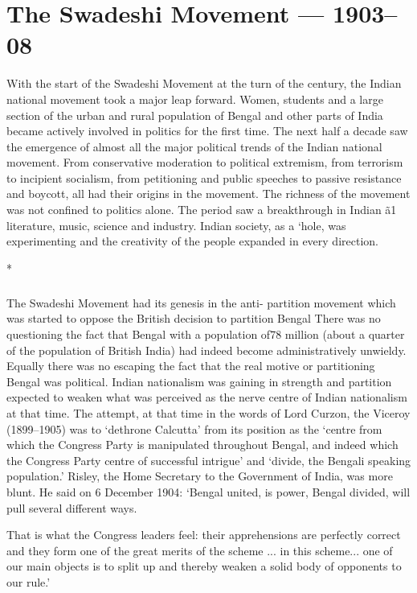 \chapter{The Swadeshi Movement --- 1903--08}\label{chapter:CH10}

With the start of the Swadeshi Movement at the turn of the century, the Indian national movement took a major leap forward. Women, students and a large section of the urban and rural population of Bengal and other parts of India became actively involved in politics for the first time. The next half a decade saw the emergence of almost all the major political trends of the Indian national movement. From conservative moderation to political extremism, from terrorism to incipient socialism, from petitioning and public speeches to passive resistance and boycott, all had their origins in the movement. The richness of the movement was not confined to politics alone. The period saw a breakthrough in Indian ã1 literature, music, science and industry. Indian society, as a `hole, was experimenting and the creativity of the people expanded in every direction.

\begin{center}*\end{center}

\paragraph*{}
The Swadeshi Movement had its genesis in the anti- partition movement which was started to oppose the British decision to partition Bengal There was no questioning the fact that Bengal with a population of78 million (about a quarter of the population of British India) had indeed become administratively unwieldy. Equally there was no escaping the fact that the real motive or partitioning Bengal was political. Indian nationalism was gaining in strength and partition expected to weaken what was perceived as the nerve centre of Indian nationalism at that time. The attempt, at that time in the words of Lord Curzon, the Viceroy (1899--1905) was to `dethrone Calcutta' from its position as the `centre from which the Congress Party is manipulated throughout Bengal, and indeed which the Congress Party centre of successful intrigue' and `divide, the Bengali speaking population.' Risley, the Home Secretary to the Government of India, was more blunt. He said on 6 December 1904: `Bengal united, is power, Bengal divided, will pull several different ways.

That is what the Congress leaders feel: their apprehensions are perfectly correct and they form one of the great merits of the scheme ... in this scheme... one of our main objects is to split up and thereby weaken a solid body of opponents to our rule.'


